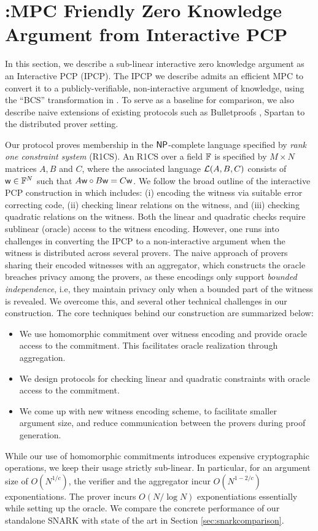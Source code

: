 \section{\name:MPC Friendly Zero Knowledge Argument from Interactive
PCP}\label{sec:graphene}
In this section, we describe a sub-linear interactive zero knowledge argument as
an Interactive PCP (IPCP). The IPCP we describe admits an efficient MPC to
convert it to a publicly-verifiable, non-interactive argument of knowledge,
using the ``BCS'' transformation in \cite{BCS16}.  To serve as a
baseline for comparison, we also describe naive extensions of existing protocols
such as Bulletproofs \cite{bulletproofs}, Spartan \cite{spartan} to the
distributed prover setting. 

Our protocol proves membership in the $\mathsf{NP}$-complete
language specified by {\em rank one constraint system} (R1CS). An R1CS over a
field $\mathbb{F}$ is specified by $M\times N$ matrices $A,B$ and $C$, where the
associated language $\mathcal{L}(A,B,C)$ consists of $\mathsf{w}\in \mathbb{F}^N$ such that
$A\mathsf{w}\circ B\mathsf{w}=C\mathsf{w}$. We follow the broad outline of the interactive PCP
construction in \cite{ligero} which includes: (i) encoding the witness via suitable
error correcting code, (ii) checking linear relations on the witness, and 
(iii) checking quadratic relations on
the witness. Both the linear and quadratic checks require sublinear (oracle) access to the 
witness encoding.
However, one runs into 
challenges in converting the IPCP to a non-interactive
argument when the witness is distributed across several provers. The naive
approach of provers sharing their encoded witnesses with an aggregator, which
constructs the oracle breaches privacy among the provers, as these encodings
only support {\em bounded independence}, i.e, they maintain privacy only when a
bounded part of the witness is revealed. We overcome this, and several other
technical challenges in our construction. The core techniques behind our
construction are summarized below:
\begin{itemize}
\item We use homomorphic commitment over witness encoding and provide oracle
access to the commitment. This facilitates oracle realization through
aggregation.
\item We design protocols for checking linear and quadratic constraints
with oracle access to the commitment.
\item We come up with new witness encoding scheme, to facilitate smaller
argument size, and reduce communication between the provers during proof
generation.
\end{itemize}
While our use of homomorphic commitments introduces expensive cryptographic
operations, we keep their usage strictly sub-linear. In particular, for an
argument size of $O(N^{1/c})$, the verifier and the aggregator incur $O(N^{1-2/c})$
exponentiations. The prover incurs $O(N/\log N)$ exponentiations essentially while
setting up the oracle. We compare the concrete performance of our standalone SNARK with state of the art in Section
\ref{sec:snarkcomparison}.
